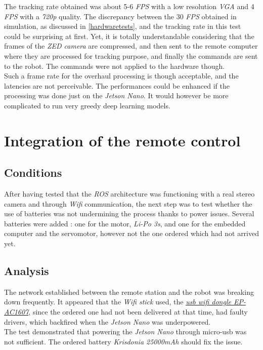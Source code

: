 		The tracking rate obtained was about 5-6 \textit{FPS} with 
		a low resolution \textit{VGA} and 4 \textit{FPS} with a \textit{720p} quality.
		The discrepancy between the 30 \textit{FPS} obtained
		in simulation, as discussed in \vref{hardwaretests}, and the 
		tracking rate in this test could be surprising at first.
		Yet, it is totally understandable considering that the 
		frames of the \textit{ZED camera} are compressed, and then sent
		to the remote computer where they are processed for tracking 
		purpose, and finally the commands are sent to the robot. 
		The commands were not applied to the hardware though.
		\\\indent Such a frame rate for the overhaul processing 
		is though acceptable, and the latencies are not 
		perceivable. The performances could be enhanced if the 
		processing was done just on the \textit{Jetson Nano}.
		It would however be more complicated to run very 
		greedy deep learning models.

	\section{Integration of the remote control}\label{test2}
	
		\subsection{Conditions}
		
		After having tested that the \textit{ROS} architecture
		was functioning with a real stereo camera and through 
		\textit{Wifi} communication,  the next step was to test
		whether the use of batteries was not undermining the 
		process thanks to power issues. Several batteries 
		were added : one for the motor, \textit{Li-Po 3s}, and 
		one for the embedded computer and the servomotor, however 
		not the one ordered which had not arrived yet. 
	
		\subsection{Analysis}
		
		The network established between 
		the remote station and the robot was breaking down frequently.
		It appeared that the \textit{Wifi stick} used, the
		\href{https://www.miniinthebox.com/en/p/5ghz-usb-wifi-adapter-600mbps-wifi-antenna-2dbi-support-windows-mac-802-11ac-usb-network-card-wifi-dongle-for-desktop-laptop-pc\_p5957285.html?prm=2.3.5.1}{\textit{usb wifi dongle EP-AC1607}}, since the 
		ordered one had not been delivered at that time, had 
		faulty drivers, which backfired when the \textit{Jetson Nano} was
		underpowered.
		\\\indent The test demonstrated that powering the 
		\textit{Jetson Nano} through micro-usb was not 
		sufficient. The ordered battery \textit{Krisdonia 25000mAh}
		should fix the issue.
		
